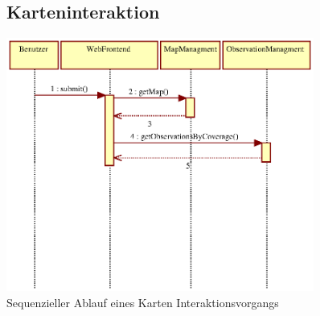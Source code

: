 \documentclass[a4paper,11pt]{scrartcl}
\begin{document}
\begin{figure}[h]
\subsection{Karteninteraktion}
		\centering
		\includegraphics[width=0.90\textwidth]{images/seq15_KartenInteraktion.eps}
		\caption{Sequenzieller Ablauf eines Karten Interaktionsvorgangs}
		\label{seq15}
\end{figure}
\end{document}
